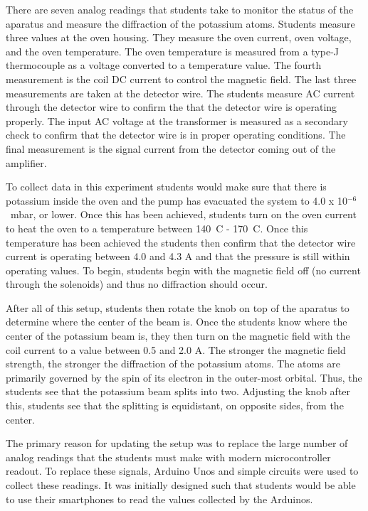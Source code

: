 There are seven analog readings that students take to monitor the status of the aparatus and measure the diffraction of the potassium atoms.
Students measure three values at the oven housing.
They measure the oven current, oven voltage, and the oven temperature.
The oven temperature is measured from a type-J thermocouple as a voltage converted to a temperature value.
The fourth measurement is the coil DC current to control the magnetic field.
The last three measurements are taken at the detector wire.
The students measure AC current through the detector wire to confirm the that the detector wire is operating properly.
The input AC voltage at the transformer is measured as a secondary check to confirm that the detector wire is in proper operating conditions.
The final measurement is the signal current from the detector coming out of the amplifier.

To collect data in this experiment students would make sure that there is potassium inside the oven and the pump has evacuated the system to 4.0 x 10$^{-6}$~mbar, or lower.
Once this has been achieved, students turn on the oven current to heat the oven to a temperature between 140\textdegree~C - 170\textdegree~C.
Once this temperature has been achieved the students then confirm that the detector wire current is operating between 4.0 and 4.3 A and that the pressure is still within operating values.
To begin, students begin with the magnetic field off (no current through the solenoids) and thus no diffraction should occur.

After all of this setup, students then rotate the knob on top of the aparatus to determine where the center of the beam is.
Once the students know where the center of the potassium beam is, they then turn on the magnetic field with the coil current to a value between 0.5 and 2.0 A.
The stronger the magnetic field strength, the stronger the diffraction of the potassium atoms.
The atoms are primarily governed by the spin of its electron in the outer-most orbital.
Thus, the students see that the potassium beam splits into two.
Adjusting the knob after this, students see that the splitting is equidistant, on opposite sides, from the center.

The primary reason for updating the setup was to replace the large number of analog readings that the students must make with modern microcontroller readout.
To replace these signals, Arduino Unos and simple circuits were used to collect these readings.
It was initially designed such that students would be able to use their smartphones to read the values collected by the Arduinos.

